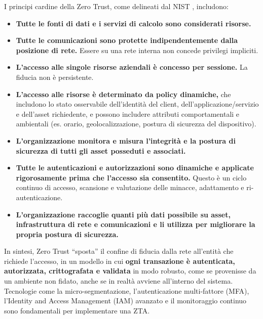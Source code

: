 I principi cardine della Zero Trust, come delineati dal NIST \cite{nistZeroTrust}, includono:
\begin{itemize}
    \item \textbf{Tutte le fonti di dati e i servizi di calcolo sono considerati risorse.}
    \item \textbf{Tutte le comunicazioni sono protette indipendentemente dalla posizione di rete.} Essere su una rete interna non concede privilegi impliciti.
    \item \textbf{L'accesso alle singole risorse aziendali è concesso per sessione.} La fiducia non è persistente.
    \item \textbf{L'accesso alle risorse è determinato da policy dinamiche,} che includono lo stato osservabile dell'identità del client, dell'applicazione/servizio e dell'asset richiedente, e possono includere attributi comportamentali e ambientali (es. orario, geolocalizzazione, postura di sicurezza del dispositivo).
    \item \textbf{L'organizzazione monitora e misura l'integrità e la postura di sicurezza di tutti gli asset posseduti e associati.}
    \item \textbf{Tutte le autenticazioni e autorizzazioni sono dinamiche e applicate rigorosamente prima che l'accesso sia consentito.} Questo è un ciclo continuo di accesso, scansione e valutazione delle minacce, adattamento e ri-autenticazione.
    \item \textbf{L'organizzazione raccoglie quanti più dati possibile su asset, infrastruttura di rete e comunicazioni e li utilizza per migliorare la propria postura di sicurezza.}
\end{itemize}
In sintesi, Zero Trust “sposta” il confine di fiducia dalla rete all'entità che richiede l'accesso, in un modello in cui \textbf{ogni transazione è autenticata, autorizzata, crittografata e validata} in modo robusto, come se provenisse da un ambiente non fidato, anche se in realtà avviene all'interno del sistema. Tecnologie come la micro-segmentazione, l'autenticazione multi-fattore (MFA), l'Identity and Access Management (IAM) avanzato e il monitoraggio continuo sono fondamentali per implementare una ZTA.

